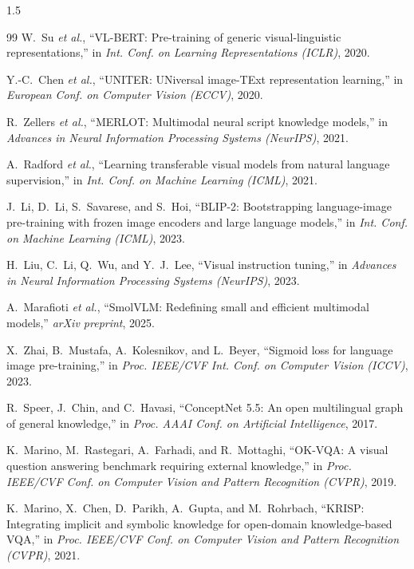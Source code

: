 \documentclass[a4paper, 14pt, oneside]{Thesis}
\begin{document}
{\begin{spacing}{1.5}
\begin{thebibliography}{99}
W.~Su \textit{et al.}, ``VL-BERT: Pre-training of generic visual-linguistic representations,'' in \textit{Int. Conf. on Learning Representations (ICLR)}, 2020.

Y.-C.~Chen \textit{et al.}, ``UNITER: UNiversal image-TExt representation learning,'' in \textit{European Conf. on Computer Vision (ECCV)}, 2020.

R.~Zellers \textit{et al.}, ``MERLOT: Multimodal neural script knowledge models,'' in \textit{Advances in Neural Information Processing Systems (NeurIPS)}, 2021.

A.~Radford \textit{et al.}, ``Learning transferable visual models from natural language supervision,'' in \textit{Int. Conf. on Machine Learning (ICML)}, 2021.

J.~Li, D.~Li, S.~Savarese, and S.~Hoi, ``BLIP-2: Bootstrapping language-image pre-training with frozen image encoders and large language models,'' in \textit{Int. Conf. on Machine Learning (ICML)}, 2023.

H.~Liu, C.~Li, Q.~Wu, and Y.~J.~Lee, ``Visual instruction tuning,'' in \textit{Advances in Neural Information Processing Systems (NeurIPS)}, 2023.

A.~Marafioti \textit{et al.}, ``SmolVLM: Redefining small and efficient multimodal models,'' \textit{arXiv preprint}, 2025.

X.~Zhai, B.~Mustafa, A.~Kolesnikov, and L.~Beyer, ``Sigmoid loss for language image pre-training,'' in \textit{Proc. IEEE/CVF Int. Conf. on Computer Vision (ICCV)}, 2023.

R.~Speer, J.~Chin, and C.~Havasi, ``ConceptNet 5.5: An open multilingual graph of general knowledge,'' in \textit{Proc. AAAI Conf. on Artificial Intelligence}, 2017.

K.~Marino, M.~Rastegari, A.~Farhadi, and R.~Mottaghi, ``OK-VQA: A visual question answering benchmark requiring external knowledge,'' in \textit{Proc. IEEE/CVF Conf. on Computer Vision and Pattern Recognition (CVPR)}, 2019.

K.~Marino, X.~Chen, D.~Parikh, A.~Gupta, and M.~Rohrbach, ``KRISP: Integrating implicit and symbolic knowledge for open-domain knowledge-based VQA,'' in \textit{Proc. IEEE/CVF Conf. on Computer Vision and Pattern Recognition (CVPR)}, 2021.


\end{thebibliography}
\end{spacing}}
\end{document}
